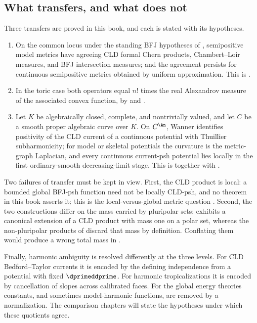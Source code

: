 \subsection{What transfers, and what does not}
\label{sec:ch16-transfer}

Three transfers are proved in this book, and each is stated with its
hypotheses.
\begin{enumerate}
\item\label{itm:ch16-transfer:model}
 On the common locus under the standing BFJ hypotheses of
 , semipositive model metrics have agreeing CLD formal
 Chern products, Chambert--Loir measures, and BFJ intersection measures; and the agreement persists for continuous semipositive metrics
 obtained by uniform approximation.  This is
 .
\item\label{itm:ch16-transfer:toric}
 In the toric case both operators equal $n!$ times the real Alexandrov
 measure of the associated convex function, by
  and
 .
\item\label{itm:ch16-transfer:curve}
 Let $K$ be algebraically closed, complete, and nontrivially valued, and
 let $C$ be a smooth proper algebraic curve over $K$.  On $C^{\An}$,
 Wanner identifies positivity of the CLD current of a continuous potential
 with Thuillier subharmonicity; for model or skeletal potentials the
 curvature is the metric-graph Laplacian, and every continuous current-psh
 potential lies locally in the first ordinary-smooth decreasing-limit
 stage.  This is
 together with
 .
\end{enumerate}
Two failures of transfer must be kept in view.  First, the CLD product is
local: a bounded global BFJ-psh function need not be locally CLD-psh, and no
theorem in this book asserts it; this is the local-versus-global metric
question .  Second, the two
constructions differ on the mass carried by pluripolar sets:
 exhibits a canonical extension of a CLD product
with mass one on a polar set, whereas the non-pluripolar products of
 discard that mass by
definition.  Conflating them would produce a wrong total mass in
.

Finally, harmonic ambiguity is resolved differently at the three levels.
For CLD Bedford--Taylor currents it is encoded by the defining independence
from a potential with fixed $\dprimeddprime$.  For harmonic tropicalizations
it is encoded by cancellation of slopes across calibrated faces.  For the
global energy theories constants, and sometimes model-harmonic functions,
are removed by a normalization.  The comparison chapters will state the
hypotheses under which these quotients agree.

